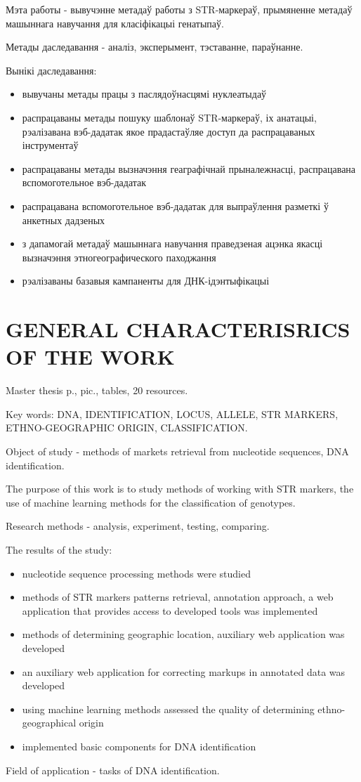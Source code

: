Мэта работы - вывучэнне метадаў работы з STR-маркераў, прымяненне метадаў машыннага навучання
для класіфікацыі генатыпаў.

Метады даследавання - аналіз, эксперымент, тэставанне, параўнанне.

Вынікі даследавання:
\begin{itemize}
\item вывучаны метады працы з паслядоўнасцямі нуклеатыдаў
\item распрацаваны метады пошуку шаблонаў STR-маркераў, іх анатацыі, рэалізавана вэб-дадатак якое прадастаўляе доступ да распрацаваных інструментаў
\item распрацаваны метады вызначэння геаграфічнай прыналежнасці, распрацавана вспомоготельное вэб-дадатак
\item распрацавана вспомоготельное вэб-дадатак для выпраўлення разметкі ў анкетных дадзеных
\item з дапамогай метадаў машыннага навучання праведзеная ацэнка якасці вызначэння этногеографического паходжання
\item рэалізаваны базавыя кампаненты для ДНК-ідэнтыфікацыі
\end{itemize}


\chapter*{GENERAL CHARACTERISRICS OF THE WORK}

Master thesis p., pic., tables, 20 resources.

Key words: DNA, IDENTIFICATION, LOCUS, ALLELE, STR MARKERS, ETHNO-GEOGRAPHIC ORIGIN, CLASSIFICATION.

Object of study - methods of markets retrieval from nucleotide sequences, DNA identification.

The purpose of this work is to study methods of working with STR markers, the use of machine learning methods
for the classification of genotypes.

Research methods - analysis, experiment, testing, comparing.

The results of the study:
\begin{itemize}
\item nucleotide sequence processing methods were studied
\item methods of STR markers patterns retrieval, annotation approach, a web application that provides access to developed tools was implemented
\item methods of determining geographic location, auxiliary web application was developed
\item an auxiliary web application for correcting markups in annotated data was developed
\item using machine learning methods assessed the quality of determining ethno-geographical origin
\item implemented basic components for DNA identification
\end{itemize}

Field of application - tasks of DNA identification.
